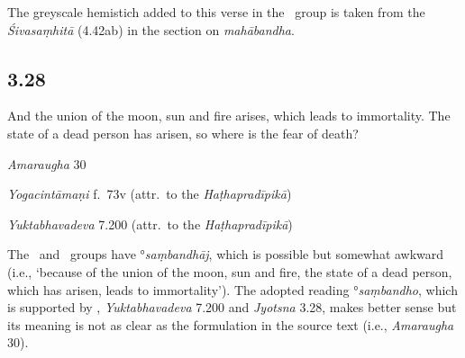 \begin{ekdosis}
\begin{philcomm}[hp03_027]
The greyscale hemistich added to this verse in the \textgamma\ group is taken from the \emph{Śivasaṃhitā} (4.42ab) in the section on \emph{mahābandha}.
\end{philcomm}

\subsection*{3.28}
\begin{translation}[hp03_028]
And the union of the moon, sun and fire arises, which leads to immortality.
The state of a dead person has arisen, so where is the fear of death?
\end{translation}

\begin{sources}[hp03_028]
\emph{Amaraugha} 30
\begin{versinnote}
\tl{\var{°saṃbandhaṃ ] °saṃbandhāj, °saṃbandhā \vl}\\!}
\end{versinnote}
\end{sources}

\begin{testimonia}[hp03_028]
\emph{Yogacintāmaṇi} f.~73v (attr.~to the \emph{Haṭhapradīpikā})
\begin{versinnote}
\tl{\var{°samutpannaṃ ] °samutpannā \vl}\\!}
\end{versinnote}

\emph{Yuktabhavadeva} 7.200 (attr.~to the \emph{Haṭhapradīpikā})
\begin{versinnote}
\end{versinnote}
\end{testimonia}

\begin{philcomm}[hp03_028]
The \textalpha\ and \textgamma\ groups have °\emph{saṃbandhāj}, which is possible but somewhat awkward (i.e., `because of the union of the moon, sun and fire, the state of a dead person, which has arisen, leads to immortality'). The adopted reading °\emph{saṃbandho}, which is supported by \epsilonTwo, \emph{Yuktabhavadeva} 7.200 and \emph{Jyotsna} 3.28, makes better sense but its meaning is not as clear as the formulation in the source text (i.e., \emph{Amaraugha} 30).


\end{philcomm}
\end{ekdosis}
